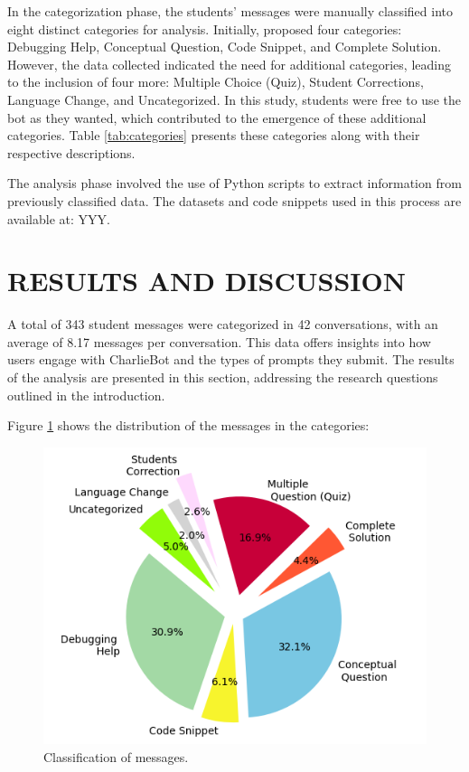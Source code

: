 \documentclass[a4paper,twoside]{article}
\begin{document}
In the categorization phase, the students' messages were manually classified
into eight distinct categories for analysis. Initially, \cite{Ghimire24}
proposed four categories: Debugging Help, Conceptual Question, Code Snippet,
and Complete Solution. However, the data collected indicated the need for
additional categories, leading to the inclusion of four more: Multiple Choice
(Quiz), Student Corrections, Language Change, and Uncategorized. In this study,
students were free to use the bot as they wanted, which contributed to the
emergence of these additional categories. Table \ref{tab:categories} presents
these categories along with their respective descriptions.

The analysis phase involved the use of Python scripts to extract information
from previously classified data. The datasets and code snippets used in this
process are available at: YYY.

\section{\uppercase{Results and Discussion}}

A total of 343 student messages were categorized in 42 conversations, with
an average of 8.17 messages per conversation. This data offers insights into how
users engage with CharlieBot and the types of prompts they submit. The results of
the analysis are presented in this section, addressing the research questions
outlined in the introduction.

Figure \ref{fig:graph1} shows the distribution of the messages in the
categories:

\begin{figure}[h!]
    \centering
    \includegraphics[scale=0.62]{img/figure1.png}
    \caption{Classification of messages.}
    \label{fig:graph1}
\end{figure}
\end{document}
